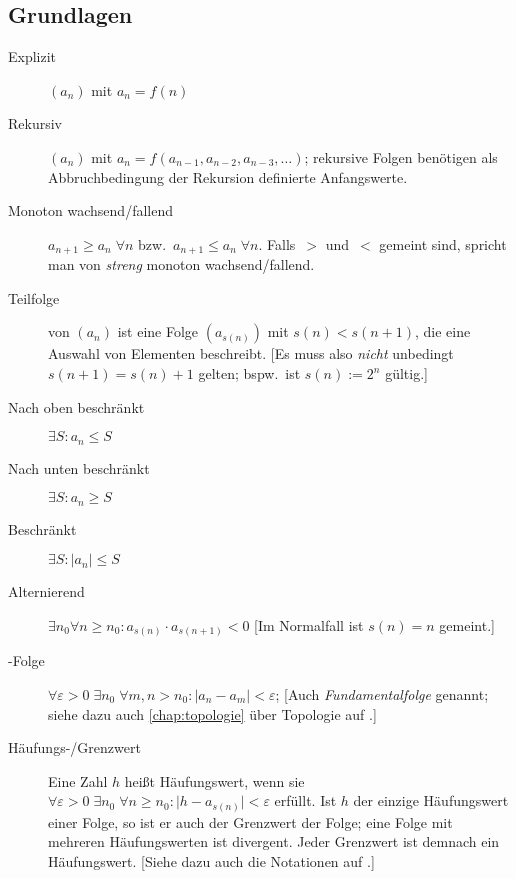 \subsection{Grundlagen}
\begin{description}
  \item [Explizit] $(a_n)$ mit $a_n = f(n)$
  \item [Rekursiv] $(a_n)$ mit $a_n = f(a_{n-1}, a_{n-2}, a_{n-3}, \ldots)$; rekursive Folgen benötigen als Abbruchbedingung der Rekursion definierte Anfangswerte.
  \item [Monoton wachsend/fallend] $a_{n+1} \geq a_n \; \forall n$ bzw.~$a_{n+1} \leq a_n \; \forall n$.
        Falls~$>$ und~$<$ gemeint sind, spricht man von \emph{streng} monoton wachsend/fallend.
  \item [Teilfolge] von $(a_n)$ ist eine Folge $(a_{s(n)})$ mit $s(n) < s(n+1)$, die eine Auswahl von Elementen beschreibt.
        [Es muss also \emph{nicht} unbedingt $s(n+1) = s(n)+1$ gelten; bspw.~ist $s(n):=2^n$ gültig.]
  \item [Nach oben beschränkt] 
        $\exists S : a_n \leq S$
  \item [Nach unten beschränkt]
        $\exists S : a_n \geq S$
  \item [Beschränkt] 
        $\exists S : \lvert a_n \rvert \leq S$
  \item [Alternierend] 
        $\exists n_0 \forall n \geq n_0 : a_{s(n)} \cdot a_{s(n+1)} < 0$
        [Im Normalfall ist $s(n)=n$ gemeint.]
  \item [-Folge] 
        $\forall \varepsilon>0\; \exists n_0\; \forall m,n>n_0 : \lvert a_n-a_m \rvert < \varepsilon$;
        [Auch \emph{Fundamentalfolge} genannt; siehe dazu auch \cref{chap:topologie} über Topologie auf .]
  \item [Häufungs-/Grenzwert]  
        Eine Zahl $h$ heißt Häufungswert, wenn sie $\forall \varepsilon>0 \; \exists n_0 \; \forall n \geq n_0 : \lvert h-a_{s(n)} \rvert < \varepsilon$ erfüllt.
        Ist $h$ der einzige Häufungswert einer Folge, so ist er auch der Grenzwert der Folge; eine Folge mit mehreren Häufungswerten ist divergent.
        Jeder Grenzwert ist demnach ein Häufungswert.
        [Siehe dazu auch die Notationen auf .]

\end{description}
